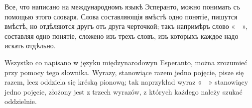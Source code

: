 \flatsmallrule{}

Все, что написано на международномъ языкѣ Эсперанто, можно понимать съ помощью этого словаря. Слова составляющія вмѣстѣ одно понятіе, пишутся вмѣстѣ, но отдѣляются другъ отъ друга черточкой; такъ напримѣръ слово «~~», составляя одно понятіе, сложено изъ трехъ словъ, изъ которыхъ каждое надо искать отдѣльно.

\flatsmallrule{}

Wszystko co napisano w języku międzynarodowyn Esperanto, można zrozumieć przy pomocy tego słownika. Wyrazy, stanowiące razem jedno pojęcie, pisze się razem, lecz oddziela się kréską pionową; tak naprzykład wyraz «~~» stanowiący jedno pojęcie, złożony jest z trzech wyrazów, z których każdego należy szukać oddzielnie.

\newpage

